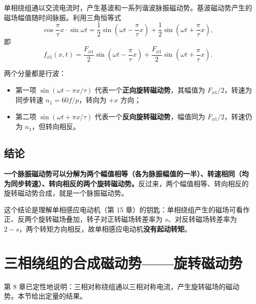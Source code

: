 单相绕组通以交流电流时，产生基波和一系列谐波脉振磁动势。基波磁动势产生的磁场幅值随时间脉振。利用三角恒等式
\begin{equation}
\cos\frac{\pi}{\tau}x\cdot\sin\omega t
=\frac12\sin\left(\omega t-\frac{\pi}{\tau}x\right)+\frac12\sin\left(\omega t+\frac{\pi}{\tau}x\right),
\end{equation}
即
\begin{equation}
f_{\phi1}(x,t)=\frac{F_{\phi1}}{2}\sin\left(\omega t-\frac{\pi}{\tau}x\right)
+\frac{F_{\phi1}}{2}\sin\left(\omega t+\frac{\pi}{\tau}x\right).
\end{equation}


两个分量都是行波：
\begin{itemize}
  \item 第一项 $\sin\left(\omega t-\pi x/\tau\right)$ 代表一个\textbf{正向旋转磁动势}，其幅值为 $F_{\phi1}/2$，转速为同步转速 $n_1=60f/p$，转向为 $+x$ 方向；
  \item 第二项 $\sin\left(\omega t+\pi x/\tau\right)$ 代表一个\textbf{反向旋转磁动势}，幅值同为 $F_{\phi1}/2$，转速仍为 $n_1$，但转向相反。
\end{itemize}

\subsection{结论}
\textbf{一个脉振磁动势可以分解为两个幅值相等（各为脉振幅值的一半）、转速相同（均为同步转速）、转向相反的两个旋转磁动势。}反过来，两个幅值相等、转向相反的旋转磁动势合成，就是一个脉振磁动势。

这个结论是理解单相感应电动机（第 15 章）的钥匙：单相绕组产生的磁场可看作正、反两个旋转磁场叠加，转子对正转磁场转差率为 $s$、对反转磁场转差率为 $2-s$，两个转矩方向相反，故单相感应电动机\textbf{没有起动转矩}。

\section{三相绕组的合成磁动势——旋转磁动势}

第 8 章已定性地说明：三相对称绕组通以三相对称电流，产生旋转磁场的磁动势。本节给出定量的结果。

